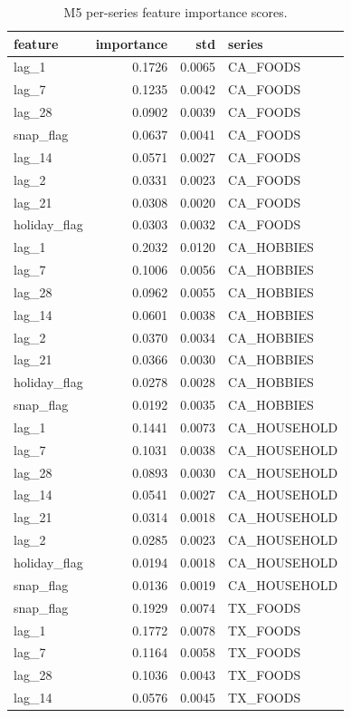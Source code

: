 \begin{table}
\caption{M5 per-series feature importance scores.}
\label{tab:02_m5_per_series_importance}
\begin{tabular}{lrrl}
\toprule
feature & importance & std & series \\
\midrule
lag_1 & 0.1726 & 0.0065 & CA_FOODS \\
lag_7 & 0.1235 & 0.0042 & CA_FOODS \\
lag_28 & 0.0902 & 0.0039 & CA_FOODS \\
snap_flag & 0.0637 & 0.0041 & CA_FOODS \\
lag_14 & 0.0571 & 0.0027 & CA_FOODS \\
lag_2 & 0.0331 & 0.0023 & CA_FOODS \\
lag_21 & 0.0308 & 0.0020 & CA_FOODS \\
holiday_flag & 0.0303 & 0.0032 & CA_FOODS \\
lag_1 & 0.2032 & 0.0120 & CA_HOBBIES \\
lag_7 & 0.1006 & 0.0056 & CA_HOBBIES \\
lag_28 & 0.0962 & 0.0055 & CA_HOBBIES \\
lag_14 & 0.0601 & 0.0038 & CA_HOBBIES \\
lag_2 & 0.0370 & 0.0034 & CA_HOBBIES \\
lag_21 & 0.0366 & 0.0030 & CA_HOBBIES \\
holiday_flag & 0.0278 & 0.0028 & CA_HOBBIES \\
snap_flag & 0.0192 & 0.0035 & CA_HOBBIES \\
lag_1 & 0.1441 & 0.0073 & CA_HOUSEHOLD \\
lag_7 & 0.1031 & 0.0038 & CA_HOUSEHOLD \\
lag_28 & 0.0893 & 0.0030 & CA_HOUSEHOLD \\
lag_14 & 0.0541 & 0.0027 & CA_HOUSEHOLD \\
lag_21 & 0.0314 & 0.0018 & CA_HOUSEHOLD \\
lag_2 & 0.0285 & 0.0023 & CA_HOUSEHOLD \\
holiday_flag & 0.0194 & 0.0018 & CA_HOUSEHOLD \\
snap_flag & 0.0136 & 0.0019 & CA_HOUSEHOLD \\
snap_flag & 0.1929 & 0.0074 & TX_FOODS \\
lag_1 & 0.1772 & 0.0078 & TX_FOODS \\
lag_7 & 0.1164 & 0.0058 & TX_FOODS \\
lag_28 & 0.1036 & 0.0043 & TX_FOODS \\
lag_14 & 0.0576 & 0.0045 & TX_FOODS \\

\end{tabular}
\end{table}
